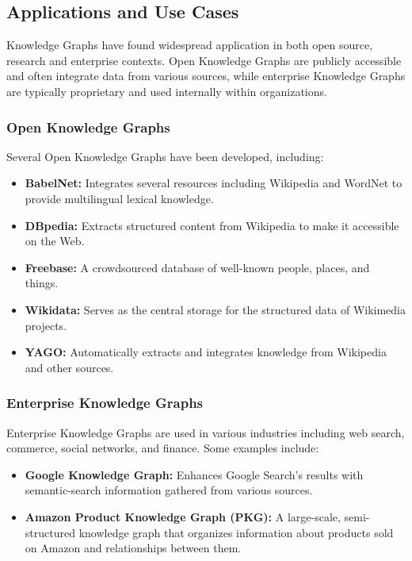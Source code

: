 \documentclass[11pt]{article} %
\begin{document}
\subsection{Applications and Use Cases}

Knowledge Graphs have found widespread application in both open source, research and enterprise contexts. Open Knowledge Graphs are publicly accessible and often integrate data from various sources, while enterprise Knowledge Graphs are typically proprietary and used internally within organizations.

\subsubsection*{Open Knowledge Graphs}

Several Open Knowledge Graphs have been developed, including:

\begin{itemize}
    \item \textbf{BabelNet:} Integrates several resources including Wikipedia and WordNet to provide multilingual lexical knowledge.
    \item \textbf{DBpedia:} Extracts structured content from Wikipedia to make it accessible on the Web.
    \item \textbf{Freebase:} A crowdsourced database of well-known people, places, and things.
    \item \textbf{Wikidata:} Serves as the central storage for the structured data of Wikimedia projects.
    \item \textbf{YAGO:} Automatically extracts and integrates knowledge from Wikipedia and other sources.
\end{itemize}

\subsubsection*{Enterprise Knowledge Graphs}

Enterprise Knowledge Graphs are used in various industries including web search, commerce, social networks, and finance. Some examples include:

\begin{itemize}
    \item \textbf{Google Knowledge Graph:} Enhances Google Search's results with semantic-search information gathered from various sources.
    \item \textbf{Amazon Product Knowledge Graph (PKG):} A large-scale, semi-structured knowledge graph that organizes information about products sold on Amazon and relationships between them.
\end{itemize}
\end{document}
